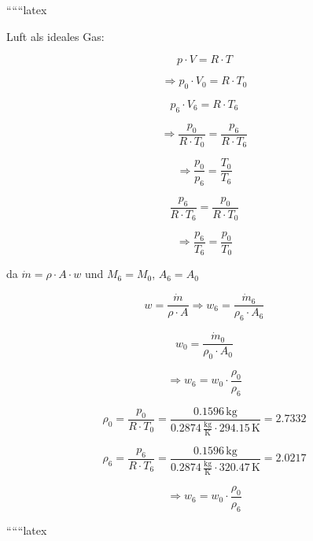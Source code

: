 ``````latex


Luft als ideales Gas:

\begin{equation}
p \cdot V = R \cdot T
\end{equation}

\begin{equation}
\Rightarrow p_0 \cdot V_0 = R \cdot T_0
\end{equation}

\begin{equation}
p_6 \cdot V_6 = R \cdot T_6
\end{equation}

\begin{equation}
\Rightarrow \frac{p_0}{R \cdot T_0} = \frac{p_6}{R \cdot T_6}
\end{equation}

\begin{equation}
\Rightarrow \frac{p_0}{p_6} = \frac{T_0}{T_6}
\end{equation}

\begin{equation}
\frac{p_6}{R \cdot T_6} = \frac{p_0}{R \cdot T_0}
\end{equation}

\begin{equation}
\Rightarrow \frac{p_6}{T_6} = \frac{p_0}{T_0}
\end{equation}

da \(\dot{m} = \rho \cdot A \cdot w\) und \(M_6 = M_0\), \(A_6 = A_0\)

\begin{equation}
w = \frac{\dot{m}}{\rho \cdot A} \Rightarrow w_6 = \frac{\dot{m}_6}{\rho_6 \cdot A_6}
\end{equation}

\begin{equation}
w_0 = \frac{\dot{m}_0}{\rho_0 \cdot A_0}
\end{equation}

\begin{equation}
\Rightarrow w_6 = w_0 \cdot \frac{\rho_0}{\rho_6}
\end{equation}

\begin{equation}
\rho_0 = \frac{p_0}{R \cdot T_0} = \frac{0.1596 \, \text{kg}}{0.2874 \, \frac{\text{kg}}{\text{K}} \cdot 294.15 \, \text{K}} = 2.7332
\end{equation}

\begin{equation}
\rho_6 = \frac{p_6}{R \cdot T_6} = \frac{0.1596 \, \text{kg}}{0.2874 \, \frac{\text{kg}}{\text{K}} \cdot 320.47 \, \text{K}} = 2.0217
\end{equation}

\begin{equation}
\Rightarrow w_6 = w_0 \cdot \frac{\rho_0}{\rho_6}
\end{equation}

``````latex


